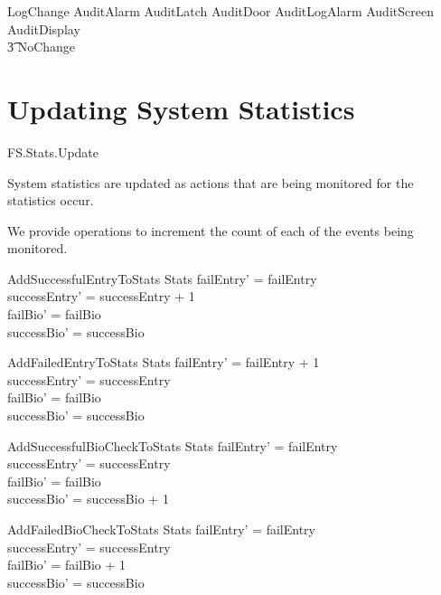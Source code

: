 \begin{latezed}
        LogChange  AuditAlarm \lor AuditLatch \lor AuditDoor
        \lor AuditLogAlarm \lor AuditScreen \lor AuditDisplay 
\\ \t3 \lor NoChange
\end{latezed}
\section{Updating System Statistics}

\begin{traceunit}{FS.Stats.Update}
\end{traceunit}

System statistics are updated as actions that are being monitored for
the statistics occur.

We provide operations to increment the count of each of the events
being monitored.

\begin{schema}{AddSuccessfulEntryToStats}
        \Delta Stats
\where
        failEntry' = failEntry 
\\      successEntry' = successEntry + 1
\\      failBio' = failBio
\\      successBio' = successBio 
\end{schema}

\begin{schema}{AddFailedEntryToStats}
        \Delta Stats
\where
        failEntry' = failEntry + 1
\\      successEntry' = successEntry
\\      failBio' = failBio
\\      successBio' = successBio 
\end{schema}

\begin{schema}{AddSuccessfulBioCheckToStats}
        \Delta Stats
\where
        failEntry' = failEntry 
\\      successEntry' = successEntry
\\      failBio' = failBio
\\      successBio' = successBio + 1
\end{schema}

\begin{schema}{AddFailedBioCheckToStats}
        \Delta Stats
\where
        failEntry' = failEntry 
\\      successEntry' = successEntry
\\      failBio' = failBio + 1
\\      successBio' = successBio
\end{schema}


